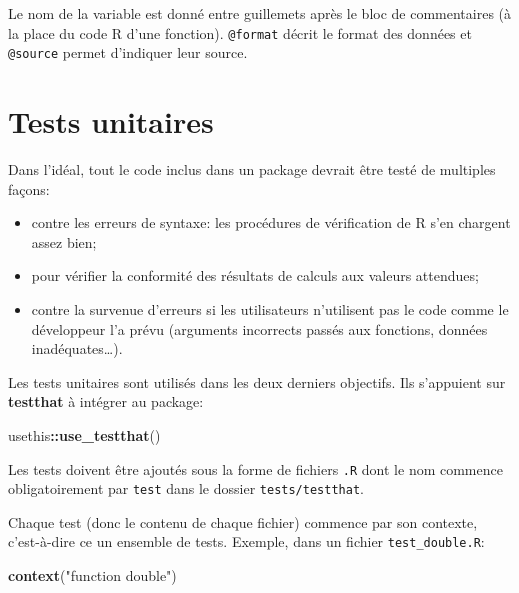 \documentclass[
  12pt,
  french,
  a4paper,
  extrafontsizes,onecolumn,openright
  ]{memoir}
\newenvironment{Shaded}{\begin{snugshade}}{\end{snugshade}}
\newcommand{\FunctionTok}[1]{\textcolor[rgb]{0.13,0.29,0.53}{\textbf{#1}}}
\newcommand{\NormalTok}[1]{#1}
\newcommand{\SpecialCharTok}[1]{\textcolor[rgb]{0.81,0.36,0.00}{\textbf{#1}}}
\newcommand{\StringTok}[1]{\textcolor[rgb]{0.31,0.60,0.02}{#1}}
\providecommand{\tightlist}{%
  \setlength{\itemsep}{0pt}\setlength{\parskip}{0pt}}
\begin{document}
\normalsize

Le nom de la variable est donné entre guillemets après le bloc de commentaires (à la place du code R d'une fonction).
\texttt{@format} décrit le format des données et \texttt{@source} permet d'indiquer leur source.

\section{Tests unitaires}\label{tests-unitaires}

Dans l'idéal, tout le code inclus dans un package devrait être testé de multiples façons:

\begin{itemize}
\tightlist
\item
  contre les erreurs de syntaxe: les procédures de vérification de R s'en chargent assez bien;
\item
  pour vérifier la conformité des résultats de calculs aux valeurs attendues;
\item
  contre la survenue d'erreurs si les utilisateurs n'utilisent pas le code comme le développeur l'a prévu (arguments incorrects passés aux fonctions, données inadéquates\ldots).
\end{itemize}

Les tests unitaires sont utilisés dans les deux derniers objectifs.
Ils s'appuient sur \textbf{testthat} à intégrer au package:

\scriptsize

\begin{Shaded}
\begin{Highlighting}[]
\NormalTok{usethis}\SpecialCharTok{::}\FunctionTok{use\_testthat}\NormalTok{()}
\end{Highlighting}
\end{Shaded}

\normalsize

\scriptsize

\normalsize

Les tests doivent être ajoutés sous la forme de fichiers \texttt{.R} dont le nom commence obligatoirement par \texttt{test} dans le dossier \texttt{tests/testthat}.

Chaque test (donc le contenu de chaque fichier) commence par son contexte, c'est-à-dire ce un ensemble de tests. Exemple, dans un fichier \texttt{test\_double.R}:

\scriptsize

\begin{Shaded}
\begin{Highlighting}[]
\FunctionTok{context}\NormalTok{(}\StringTok{"function double"}\NormalTok{)}
\end{Highlighting}
\end{Shaded}
\end{document}
